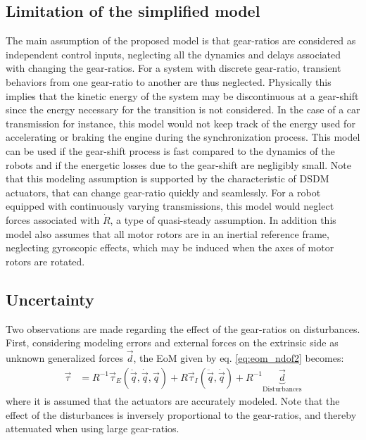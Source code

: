 \subsection{Limitation of the simplified model}
\label{sec:limitation}
%
The main assumption of the proposed model is that gear-ratios are considered as independent control inputs, neglecting all the dynamics and delays associated with changing the gear-ratios. For a system with discrete gear-ratio, transient behaviors from one gear-ratio to another are thus neglected. Physically this implies that the kinetic energy of the system may be discontinuous at a gear-shift since the energy necessary for the transition is not considered. In the case of a car transmission for instance, this model would not keep track of the energy used for accelerating or braking the engine during the synchronization process. This model can be used if the gear-shift process is fast compared to the dynamics of the robots and if the energetic losses due to the gear-shift are negligibly small. Note that this modeling assumption is supported by the characteristic of DSDM actuators, that can change gear-ratio quickly and seamlessly. For a robot equipped with continuously varying transmissions, this model would neglect forces associated with $\dot{R}$, a type of quasi-steady assumption. 
%
In addition this model also assumes that all motor rotors are in an inertial reference frame, neglecting gyroscopic effects, which may be induced when the axes of motor rotors are rotated.

\subsection{Uncertainty}
\label{sec:uncertainty}

Two observations are made regarding the effect of the gear-ratios on disturbances. First, considering modeling errors and external forces on the extrinsic side as unknown generalized forces $\vec{d}$, the EoM given by eq. \eqref{eq:eom_ndof2} becomes:
\begin{align}
	\vec{\tau} &= R^{-1} 
	\vec{\tau}_{E}(\ddot{\vec{q}},\dot{\vec{q}},\vec{q}) 
	+ R 
	\vec{\tau}_{I}(\ddot{\vec{q}},\dot{\vec{q}})
    + R^{-1}
    \underbrace{ 
	\vec{d}
	}_{\text{Disturbances}}    
 \label{eq:eom_ndof3}
\end{align}
where it is assumed that the actuators are accurately modeled. Note that the effect of the disturbances is inversely proportional to the gear-ratios, and thereby attenuated when using large gear-ratios. 

